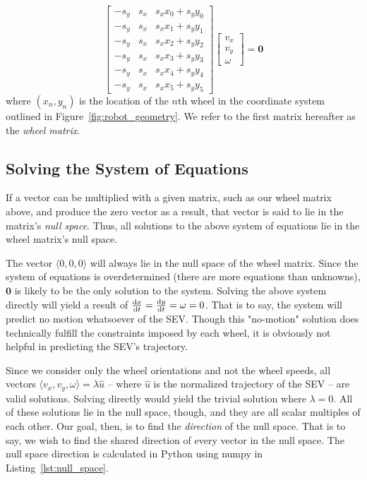\documentclass{article}
\begin{document}
\begin{equation}
\label{eq:system_of_wheels}
    \begin{bmatrix}
        -s_y & s_x & s_x x_0+s_y y_0 \\
        -s_y & s_x & s_x x_1+s_y y_1 \\
        -s_y & s_x & s_x x_2+s_y y_2 \\
        -s_y & s_x & s_x x_3+s_y y_3 \\
        -s_y & s_x & s_x x_4+s_y y_4 \\
        -s_y & s_x & s_x x_5+s_y y_5
    \end{bmatrix}
    \begin{bmatrix}
        v_x \\
        v_y \\
        \omega
    \end{bmatrix}
    =
    \mathbf{0}
\end{equation}
where $(x_n, y_n)$ is the location of the $n\text{th}$ wheel in the coordinate system outlined in Figure~\ref{fig:robot_geometry}. We refer to the first matrix hereafter as the \emph{wheel matrix}.

\subsection{Solving the System of Equations}

If a vector can be multiplied with a given matrix, such as our wheel matrix above, and produce the zero vector as a result, that vector is said to lie in the matrix's \emph{null space}. Thus, all solutions to the above system of equations lie in the wheel matrix's null space.

The vector $\langle 0, 0, 0 \rangle$ will always lie in the null space of the wheel matrix. Since the system of equations is overdetermined (there are more equations than unknowns), $\mathbf{0}$ is likely to be the only solution to the system. Solving the above system directly will yield a result of $\frac{\mathrm{d}x}{\mathrm{d}t}=\frac{\mathrm{d}y}{\mathrm{d}t}=\omega=0$. That is to say, the system will predict no motion whatsoever of the SEV. Though this "no-motion" solution does technically fulfill the constraints imposed by each wheel, it is obviously not helpful in predicting the SEV's trajectory.

Since we consider only the wheel orientations and not the wheel speeds, all vectors $\langle v_x, v_y, \omega \rangle = \lambda \hat{u}$ -- where $\hat{u}$ is the normalized trajectory of the SEV -- are valid solutions. Solving directly would yield the trivial solution where $\lambda = 0$. All of these solutions lie in the null space, though, and they are all scalar multiples of each other. Our goal, then, is to find the \emph{direction} of the null space. That is to say, we wish to find the shared direction of every vector in the null space. The null space direction is calculated in Python using numpy in Listing~\ref{lst:null_space}.
\end{document}
